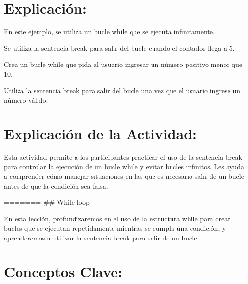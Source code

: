 \documentclass[
  a4paper,
  onepage,
  openany]{scrreprt}
\begin{document}
\hypertarget{explicaciuxf3n-38}{%
\section{Explicación:}\label{explicaciuxf3n-38}}

En este ejemplo, se utiliza un bucle while que se ejecuta infinitamente.

Se utiliza la sentencia break para salir del bucle cuando el contador
llega a 5.

\begin{tcolorbox}[enhanced jigsaw, breakable, opacityback=0, toptitle=1mm, coltitle=black, toprule=.15mm, rightrule=.15mm, colframe=quarto-callout-important-color-frame, opacitybacktitle=0.6, arc=.35mm, title=\textcolor{quarto-callout-important-color}{\faExclamation}\hspace{0.5em}{Actividad Práctica:}, titlerule=0mm, colbacktitle=quarto-callout-important-color!10!white, bottomtitle=1mm, bottomrule=.15mm, colback=white, left=2mm, leftrule=.75mm]

Crea un bucle while que pida al usuario ingresar un número positivo
menor que 10.

Utiliza la sentencia break para salir del bucle una vez que el usuario
ingrese un número válido.

\end{tcolorbox}

\hypertarget{explicaciuxf3n-de-la-actividad-36}{%
\section{Explicación de la
Actividad:}\label{explicaciuxf3n-de-la-actividad-36}}

Esta actividad permite a los participantes practicar el uso de la
sentencia break para controlar la ejecución de un bucle while y evitar
bucles infinitos. Les ayuda a comprender cómo manejar situaciones en las
que es necesario salir de un bucle antes de que la condición sea falsa.

======= \#\# While loop

En esta lección, profundizaremos en el uso de la estructura while para
crear bucles que se ejecutan repetidamente mientras se cumpla una
condición, y aprenderemos a utilizar la sentencia break para salir de un
bucle.

\hypertarget{conceptos-clave-39}{%
\section{Conceptos Clave:}\label{conceptos-clave-39}}
\end{document}
